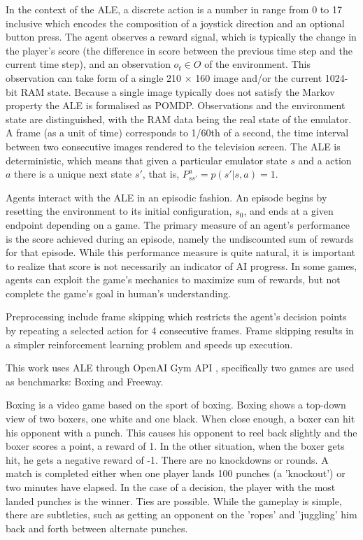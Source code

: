 In the context of the ALE, a discrete action is a number in range from 0 to 17 inclusive which encodes the composition of a joystick direction and an optional button press. The agent observes a reward signal, which is typically the change in the player’s score (the difference in score between the previous time step and the current time step), and an observation $o_t \in O$ of the environment. This observation can take form of a single 210 × 160 image and/or the current 1024-bit RAM state. Because a single image typically does not satisfy the Markov property the ALE is formalised as POMDP. Observations and the environment state are distinguished, with the RAM data being the real state of the emulator. A frame (as a unit of time) corresponds to 1/60th of a second, the time interval between two consecutive images rendered to the television screen. The ALE is deterministic, which means that given a particular emulator state $s$ and a action $a$ there is a unique next state $s'$, that is, $P^a_{ss'} = p(s' | s, a) = 1$.

Agents interact with the ALE in an episodic fashion. An episode begins by resetting the environment to its initial configuration, $s_0$, and ends at a given endpoint depending on a game. The primary measure of an agent’s performance is the score achieved during an episode, namely the undiscounted sum of rewards for that episode. While this performance measure is quite natural, it is important to realize that score is not necessarily an indicator of AI progress. In some games, agents can exploit the game's mechanics to maximize sum of rewards, but not complete the game's goal in human's understanding. \cite{Study.FaultyReward}

Preprocessing include frame skipping \cite{Study.FrameSkipping} which restricts the agent’s decision points by repeating a selected action for 4 consecutive frames. Frame skipping results in a simpler reinforcement learning problem and speeds up execution.

This work uses ALE through OpenAI Gym API \cite{Code.OpenAIGym}, specifically two games are used as benchmarks: Boxing and Freeway.

Boxing is a video game based on the sport of boxing. Boxing shows a top-down view of two boxers, one white and one black. When close enough, a boxer can hit his opponent with a punch. This causes his opponent to reel back slightly and the boxer scores a point, a reward of 1. In the other situation, when the boxer gets hit, he gets a negative reward of -1. There are no knockdowns or rounds. A match is completed either when one player lands 100 punches (a 'knockout') or two minutes have elapsed. In the case of a decision, the player with the most landed punches is the winner. Ties are possible. 
While the gameplay is simple, there are subtleties, such as getting an opponent on the 'ropes' and 'juggling' him back and forth between alternate punches. 


